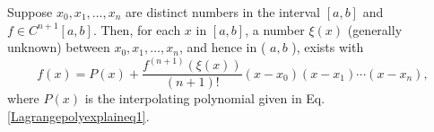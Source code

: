 \begin{theorem}\label{Lagrangepolyexplaineqthm3}
Suppose $x_{0}, x_{1}, \ldots, x_{n}$ are distinct numbers in the interval $[a, b]$ and $f \in C^{n+1}[a, b]$. Then, for each $x$ in $[a, b]$, a number $\xi(x)$ (generally unknown) between $x_{0}, x_{1}, \ldots, x_{n}$, and hence in ( $a, b$ ), exists with
\begin{equation}
f(x)=P(x)+\frac{f^{(n+1)}(\xi(x))}{(n+1)!}\left(x-x_{0}\right)\left(x-x_{1}\right) \cdots\left(x-x_{n}\right), 
\end{equation}
where $P(x)$ is the interpolating polynomial given in Eq.\ref{Lagrangepolyexplaineq1}.
\end{theorem}
%
%
%
%
%
%
%
%
%
%
%
%
%
%
%
%
%
%
%

